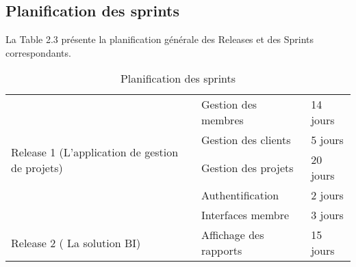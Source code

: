 \newpage
\subsection{ Planification des sprints}
La Table 2.3 pr\'{e}sente la planification g\'{e}n\'{e}rale des Releases et des Sprints correspondants.
\begin{table}

\begin{tabular}{|l|l|l|}
\hline
\multirow{5}{*}{Release 1 (L’application de gestion de projets)} & Gestion des membres    & 14 jours  \\
\cline{2-3}
                                                                 & Gestion des clients    & 5 jours   \\
\cline{2-3}
                                                                 & Gestion des projets    & 20 jours  \\
\cline{2-3}
                                                                 & Authentification       & 2 jours   \\
\cline{2-3}
                                                                 & Interfaces membre      & 3 jours   \\
\hline
Release 2 ( La solution BI)                 & Affichage des rapports & 15 jours  \\
\hline
\end{tabular}
\centering
\caption{ Planification des sprints}
\end{table}
\FloatBarrier 